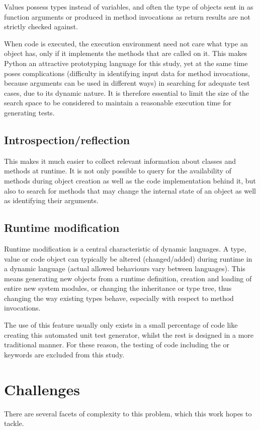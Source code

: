 \documentclass{icldt}
\numberwithin{equation}{section}       %
\begin{document}
{Values possess types instead of variables, and often the type of objects sent in as function arguments or produced in method invocations as return results are not strictly checked against.

When code is executed, the execution environment need not care what type an object has, only if it implements the methods that are called on it. This makes Python an attractive prototyping language for this study, yet at the same time poses complications (difficulty in identifying input data for method invocations, because arguments can be used in different ways) in searching for adequate test cases, due to its dynamic nature. It is therefore essential to limit the size of the search space to be considered to maintain a reasonable execution time for generating tests.

\subsection{Introspection/reflection}
This makes it much easier to collect relevant information about classes and methods at runtime. It is not only possible to query for the availability of methods during object creation as well as the code implementation behind it, but also to search for methods that may change the internal state of an object as well as identifying their arguments.

\subsection{Runtime modification}
Runtime modification is a central characteristic of dynamic languages. A type, value or code object can typically be altered (changed/added) during runtime in a dynamic language (actual allowed behaviours vary between languages). This means generating new objects from a runtime definition, creation and loading of entire new system modules, or changing the inheritance or type tree, thus changing the way existing types behave, especially with respect to method invocations.

The use of this feature usually only exists in a small percentage of code like creating this automated unit test generator, whilst the rest is designed in a more traditional manner. For these reason, the testing of code including the  or  keywords are excluded from this study.

\section{Challenges}
\label{sect:challenges}
There are several facets of complexity to this problem, which this work hopes to tackle.

}
\end{document}
